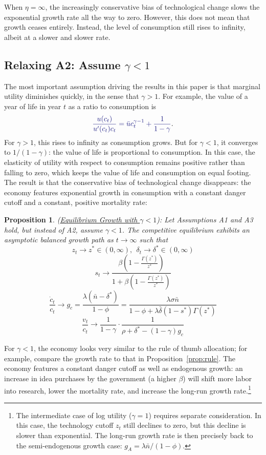 \documentclass[12pt,twoside]{article}
\newcommand{\growth}[1]{\frac{\dot{#1}_t}{{#1}_t}}
\newcommand{\proptitle}[1]{\color{ChadBlue} \textnormal{(#1):}}
\newtheorem{proposition}{\color{ChadGreen} Proposition}
\newcommand{\clr}[1]{{\color{ChadBlue} #1}}
\begin{document}
When $\eta=\infty$, the increasingly conservative bias of technological
change slows the exponential growth rate all the way to zero. However,
this does not mean that growth ceases entirely. Instead, the level of
consumption still rises to infinity, albeit at a slower and slower rate.



\subsection{Relaxing A2: Assume $\gamma<1$}

The most important assumption driving the results in this paper is that
marginal utility diminishes quickly, in the sense that $\gamma>1$.  For
example, the value of a year of life in year $t$ as a ratio to
consumption is
\[ \clr{ 
  \frac{u(c_t)}{u'(c_t)c_t} = \bar{u} c_t^{\gamma-1}+
  \frac{1}{1-\gamma}}. 
\] 
For $\gamma>1$, this rises to infinity as consumption grows. But for
$\gamma<1$, it converges to $1/(1-\gamma)$: the value of life is
proportional to consumption. In this case, the elasticity of utility
with respect to consumption remains positive rather than falling to
zero, which keeps the value of life and consumption on equal footing.
The result is that the conservative bias of technological change
disappears: the economy features exponential growth in consumption with
a constant danger cutoff and a constant, positive mortality rate:

\begin{proposition}
\proptitle{\hyperlink{proof:gamma}{Equilibrium Growth with $\gamma<1$}}
\label{prop:gamma} \hypertarget{prop:gamma}{}
Let Assumptions A1 and A3 hold, but instead of A2, assume $\gamma<1$.
The competitive equilibrium exhibits an asymptotic balanced growth path
as $t \rightarrow \infty$ such that
\[ z_t \rightarrow z^* \in (0,\infty), \ \ \delta_t \rightarrow \delta^* \in (0,\infty)  \] 
\[ s_t \rightarrow \frac{\beta (1-\frac{\Gamma(z^*)}{z^*})}{1+\beta (1-\frac{\Gamma(z^*)}{z^*})} \]
\[ \growth{c} \rightarrow g_c=\frac{\lambda(\bar{n}-\delta^*)}{1-\phi}= \frac{\lambda \sigma
  \bar{n}}{1-\phi+\lambda \bar{\delta} (1-s^*) \Gamma(z^*)}\]
\[ \frac{v_t}{c_t} \rightarrow \frac{1}{1-\gamma} \cdot
\frac{1}{\rho+\delta^*-(1-\gamma) g_c} \]
\end{proposition}

For $\gamma<1$, the economy looks very similar to the rule of thumb
allocation; for example, compare the growth rate to that in
Proposition~\ref{prop:rule}. The economy features a constant danger
cutoff as well as endogenous growth: an increase in idea purchases by
the government (a higher $\beta$) will shift more labor into research,
lower the mortality rate, and increase the long-run growth
rate.\footnote{The intermediate case of log utility ($\gamma=1$)
  requires separate consideration. In this case, the technology cutoff
  $z_t$ still declines to zero, but this decline is slower than
  exponential. The long-run growth rate is then precisely back to the
  semi-endogenous growth case: $g_A = \lambda \bar{n}/(1-\phi)$. }
\end{document}
